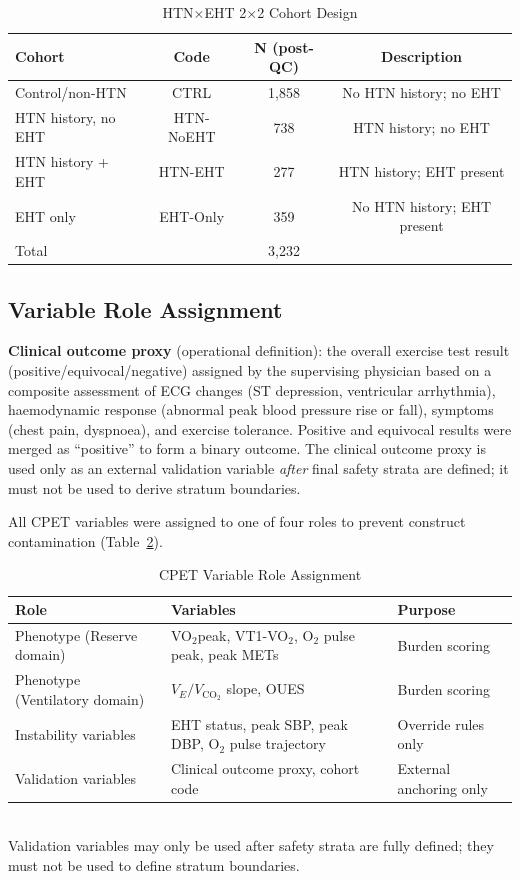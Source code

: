 \documentclass[12pt, a4paper]{article}
\begin{document}
\begin{table}[htbp]
\centering
\caption{HTN$\times$EHT 2$\times$2 Cohort Design}
\label{tab:cohort_design_en}
\begin{tabular}{lccc}
\toprule
Cohort & Code & N (post-QC) & Description \\
\midrule
Control/non-HTN & CTRL & 1,858 & No HTN history; no EHT \\
HTN history, no EHT & HTN-NoEHT & 738 & HTN history; no EHT \\
HTN history + EHT & HTN-EHT & 277 & HTN history; EHT present \\
EHT only & EHT-Only & 359 & No HTN history; EHT present \\
\midrule
Total & & 3,232 & \\
\bottomrule
\end{tabular}
\end{table}

\subsection{Variable Role Assignment}

\textbf{Clinical outcome proxy} (operational definition): the overall exercise
test result (positive/equivocal/negative) assigned by the supervising physician
based on a composite assessment of ECG changes (ST depression, ventricular
arrhythmia), haemodynamic response (abnormal peak blood pressure rise or fall),
symptoms (chest pain, dyspnoea), and exercise tolerance. Positive and equivocal
results were merged as ``positive'' to form a binary outcome. The clinical outcome
proxy is used only as an external validation variable \emph{after} final safety
strata are defined; it must not be used to derive stratum boundaries.

All CPET variables were assigned to one of four roles to prevent construct
contamination (Table~\ref{tab:variable_roles_en}).

\begin{table}[htbp]
\centering
\small
\caption{CPET Variable Role Assignment}
\label{tab:variable_roles_en}
\begin{tabular}{lll}
\toprule
Role & Variables & Purpose \\
\midrule
Phenotype (Reserve domain) & VO$_2$peak, VT1-VO$_2$, O$_2$ pulse peak, peak METs & Burden scoring \\
Phenotype (Ventilatory domain) & $V_E/V_{\text{CO}_2}$ slope, OUES & Burden scoring \\
Instability variables & EHT status, peak SBP, peak DBP, O$_2$ pulse trajectory & Override rules only \\
Validation variables & Clinical outcome proxy, cohort code & External anchoring only \\
\bottomrule
\end{tabular}
\\[1ex]
{\footnotesize Validation variables may only be used after safety strata are fully defined; they must not be used to define stratum boundaries.}
\end{table}
\end{document}
